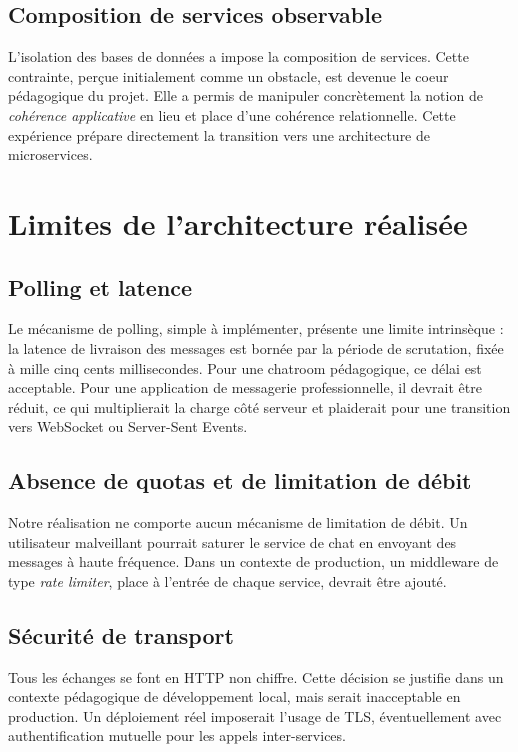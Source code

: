 \subsection{Composition de services observable}

L'isolation des bases de données a impose la composition de services. Cette contrainte, perçue initialement comme un obstacle, est devenue le coeur pédagogique du projet. Elle a permis de manipuler concrètement la notion de \emph{cohérence applicative} en lieu et place d'une cohérence relationnelle. Cette expérience prépare directement la transition vers une architecture de microservices.

\section{Limites de l'architecture réalisée}

\subsection{Polling et latence}

Le mécanisme de polling, simple à implémenter, présente une limite intrinsèque : la latence de livraison des messages est bornée par la période de scrutation, fixée à mille cinq cents millisecondes. Pour une chatroom pédagogique, ce délai est acceptable. Pour une application de messagerie professionnelle, il devrait être réduit, ce qui multiplierait la charge côté serveur et plaiderait pour une transition vers WebSocket ou Server-Sent Events.

\subsection{Absence de quotas et de limitation de débit}

Notre réalisation ne comporte aucun mécanisme de limitation de débit. Un utilisateur malveillant pourrait saturer le service de chat en envoyant des messages à haute fréquence. Dans un contexte de production, un middleware de type \emph{rate limiter}, place à l'entrée de chaque service, devrait être ajouté.

\subsection{Sécurité de transport}

Tous les échanges se font en HTTP non chiffre. Cette décision se justifie dans un contexte pédagogique de développement local, mais serait inacceptable en production. Un déploiement réel imposerait l'usage de TLS, éventuellement avec authentification mutuelle pour les appels inter-services.

